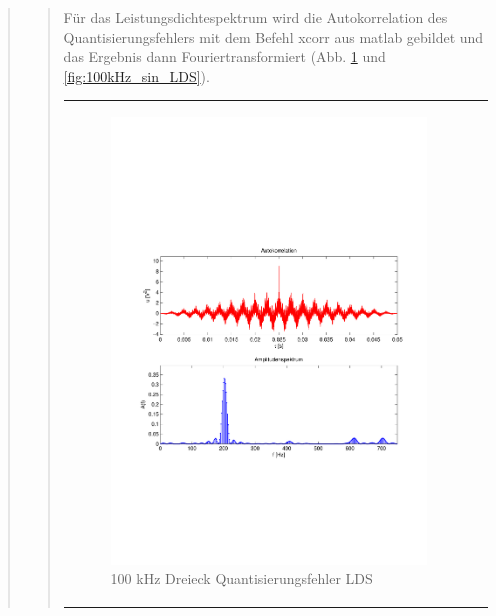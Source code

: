 \begin{quote}
\begin{quote}
	   	
	   	Für das Leistungsdichtespektrum wird die Autokorrelation des Quantisierungsfehlers mit dem Befehl xcorr aus matlab
	   	gebildet und das Ergebnis dann Fouriertransformiert (Abb. \ref{fig:100kHz_drei_LDS} und
	   	\ref{fig:100kHz_sin_LDS}).
	   	
	   	\begin{center}
            \begin{tabular}{ll}
            
            \hspace{-4cm}
                \begin{minipage}{0.6\textwidth}
                    \begin{figure}[H]
                        \includegraphics[scale=0.5, trim = 16mm 70mm 16mm 85mm, clip]
                                        {Bilder/100kHz_dreieck_LSD}
                        \caption{100 kHz Dreieck Quantisierungsfehler LDS}
                        \label{fig:100kHz_drei_LDS}
                    \end{figure}
                \end{minipage}
                

\end{tabular}
\end{center}
\end{quote}
\end{quote}
